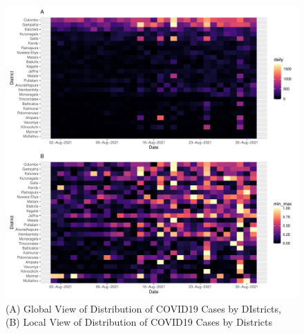 \documentclass[
]{article}
\begin{document}
\begin{figure}
\centering
\includegraphics{manuscript_covid19dashboard_files/figure-latex/unnamed-chunk-4-1.pdf}
\caption{(A) Global View of Distribution of COVID19 Cases by DIstricts,
(B) Local View of Distribution of COVID19 Cases by Districts}
\end{figure}
\end{document}
